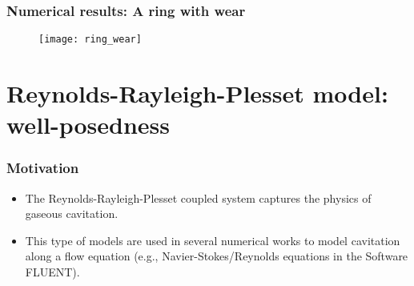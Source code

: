 \documentclass[10pt,aspectratio=169]{beamer}
\begin{document}
\begin{frame}
\frametitle{Numerical results: A ring with wear}
\vspace*{1.0cm}
\begin{figure}
	\centering
	\texttt{[image: ring\_wear]}
\end{figure}

\begin{table}
	\caption{Maximum value of $\delta$ for blow-by is not observed.}\label{tab:hmax}
\end{table}
\end{frame}


\setcounter{showSlideNumbers}{0}
\section{Reynolds-Rayleigh-Plesset model: well-posedness}
\setcounter{showSlideNumbers}{1}

\begin{frame}
\frametitle{Motivation}
\begin{itemize}
	\item The Reynolds-Rayleigh-Plesset coupled system captures the physics of gaseous cavitation.
	\item This type of models are used in several numerical works to model cavitation along a flow equation (e.g., Navier-Stokes/Reynolds equations in the Software FLUENT).
	
\end{itemize}
\end{frame}

\setcounter{showSlideNumbers}{0}
\begin{frame}[noframenumbering]
\tableofcontents[
currentsection,
currentsubsection,
subsectionstyle=show/shaded/hide
]
\end{frame}
\setcounter{showSlideNumbers}{1}
\end{document}

